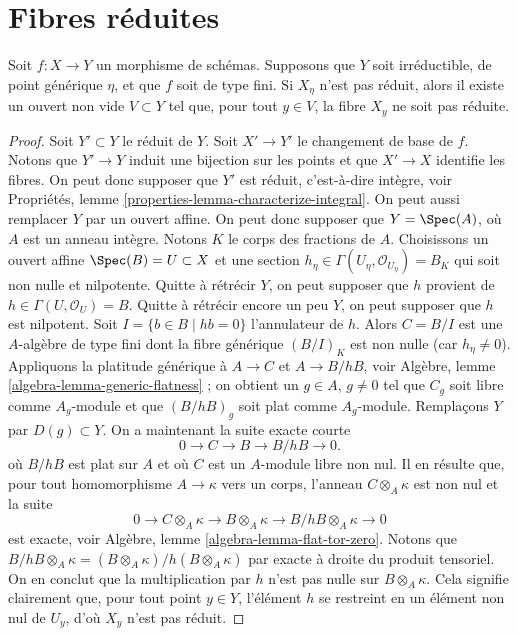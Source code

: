 \section{Fibres réduites}
\label{section-reduced}

\begin{lemma}
\label{lemma-nonreduced-in-neighbourhood}
Soit $f : X \to Y$ un morphisme de schémas. Supposons que $Y$ soit irréductible, de
point générique $\eta$, et que $f$ soit de type fini. Si $X_\eta$ n'est pas réduit,
alors il existe un ouvert non vide $V \subset Y$
tel que, pour tout $y \in V$, la fibre $X_y$ ne soit pas réduite.
\end{lemma}

\begin{proof}
Soit $Y' \subset Y$ le réduit de $Y$. Soit $X' \to Y'$
le changement de base de $f$. Notons que $Y' \to Y$
induit une bijection sur les points et que $X' \to X$ identifie les fibres.
On peut donc supposer que $Y'$ est réduit, c'est-à-dire intègre, voir
Propriétés, lemme \ref{properties-lemma-characterize-integral}.
On peut aussi remplacer $Y$ par un ouvert affine. On peut donc supposer que
$Y = \Spec(A)$, où $A$ est un anneau intègre. Notons $K$ le
corps des fractions de $A$.
Choisissons un ouvert affine $\Spec(B) = U \subset X$ et une section
$h_\eta \in \Gamma(U_\eta, \mathcal{O}_{U_\eta}) = B_K$
qui soit non nulle et nilpotente.
Quitte à rétrécir $Y$, on peut supposer que $h$ provient de
$h \in \Gamma(U, \mathcal{O}_U) = B$. Quitte à rétrécir encore un peu $Y$,
on peut supposer que $h$ est nilpotent. Soit
$I = \{b \in B \mid hb = 0\}$ l'annulateur de $h$.
Alors $C = B/I$ est une $A$-algèbre de type fini dont la fibre générique
$(B/I)_K$ est non nulle (car $h_\eta \not = 0$). Appliquons
la platitude générique à $A \to C$ et $A \to B/hB$, voir
Algèbre, lemme \ref{algebra-lemma-generic-flatness} ;
on obtient un $g \in A$, $g \not = 0$ tel que $C_g$ soit libre comme
$A_g$-module et que $(B/hB)_g$ soit plat comme $A_g$-module.
Remplaçons $Y$ par $D(g) \subset Y$. On a maintenant la suite exacte courte
$$
0 \to C \to B \to B/hB \to 0.
$$
où $B/hB$ est plat sur $A$ et où $C$ est un $A$-module libre non nul.
Il en résulte que, pour tout homomorphisme $A \to \kappa$ vers un corps,
l'anneau $C \otimes_A \kappa$ est non nul et la suite
$$
0 \to C \otimes_A \kappa \to B \otimes_A \kappa \to
B/hB \otimes_A \kappa \to 0
$$
est exacte, voir
Algèbre, lemme \ref{algebra-lemma-flat-tor-zero}.
Notons que
$B/hB \otimes_A \kappa = (B \otimes_A \kappa) / h(B \otimes_A \kappa)$
par exacte à droite du produit tensoriel. On en conclut que
la multiplication par $h$ n'est pas nulle sur $B \otimes_A \kappa$.
Cela signifie clairement que, pour tout point $y \in Y$, l'élément $h$
se restreint en un élément non nul de $U_y$, d'où $X_y$ n'est pas réduit.
\end{proof}

